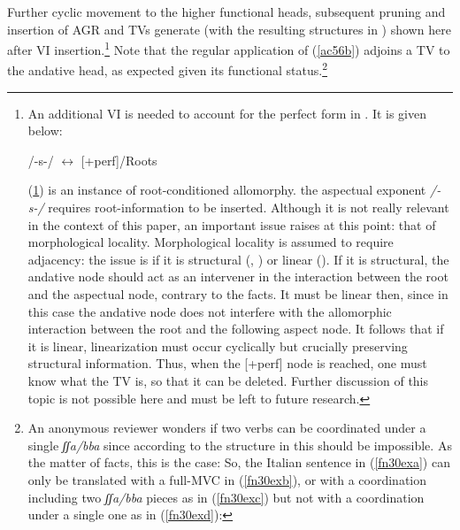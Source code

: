 \documentclass[output=paper]{langscibook}
\begin{document}
Further cyclic movement to the higher functional heads, subsequent pruning and insertion of AGR and TVs generate  (with the resulting structures in ) shown here after VI insertion.\footnote{An additional VI is needed to account for the perfect form in .  It is given below:

\ea \label{fn29ex} /-s-/ $\longleftrightarrow$ [+perf]/Roots \underline{\hspace{2em}}
\z

(\ref{fn29ex}) is an instance of root-conditioned allomorphy. the aspectual exponent \textit{/-s-/} requires root-information to be inserted. Although it is not really relevant in the context of this paper, an important issue raises at this point: that of morphological locality.  Morphological locality is assumed to require adjacency: the issue is if it is structural (\citealt{bobaljik2012a}, \citealt{calabrese2019a}) or linear (\citealt{embick2010a}).  If it is structural, the andative node should act as an intervener in the interaction between the root and the aspectual node, contrary to the facts. It must be linear then, since in this case the andative node does not interfere with the allomorphic interaction between the root and the following aspect node. It follows that if it is linear, linearization must occur cyclically but crucially preserving structural information. Thus, when the [+perf] node is reached, one must know what the TV is, so that it can be deleted. Further discussion of this topic is not possible here and must be left to future research.} Note that the regular application of (\ref{ac56b}) adjoins a TV to the andative head, as expected given its functional status.\footnote{An anonymous reviewer wonders if two verbs can be coordinated under a single \textit{ʃʃa/bba} since according to the structure in  this should be impossible. As the matter of facts, this is the case: So, the Italian sentence in (\ref{fn30exa}) can only be translated with a full-MVC in (\ref{fn30exb}), or with a coordination including two \textit{ʃʃa/bba} pieces as in (\ref{fn30exc}) but not with a coordination under a single one as in (\ref{fn30exd}):

}
\end{document}
